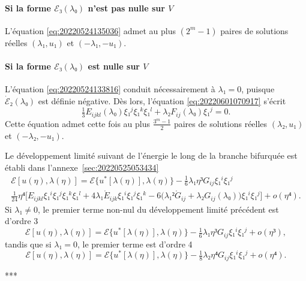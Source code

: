 \documentclass[12pt, final]{scrartcl}
\theoremstyle{definition}
\begin{document}
\paragraph{Si la forme \(ℰ₃(λ₀)\) n'est pas nulle sur \(V\)} L'équation
\eqref{eq:20220524135036} admet au plus \((2^m - 1)\) paires de solutions
réelles \((λ₁, u₁)\) et \((- λ₁, - u₁)\). 

\paragraph{Si la forme \(ℰ₃(λ₀)\) est nulle sur \(V\)} L'équation
\eqref{eq:20220524133816} conduit nécessairement à \(λ₁ = 0\), puisque
\(\dot{ℰ}₂(λ₀)\) est définie négative. Dès lors, l'équation
\eqref{eq:20220601070917} s'écrit 
\begin{equation}
 \tfrac{1}{3} E_{ijkl}(λ₀) ξ₁^j ξ₁^k ξ₁^l + λ₂ F_{ij}(λ₀) ξ₁^j = 0.
\end{equation}
Cette équation admet cette fois au plus \(\frac{3^m - 1}{2}\) paires de
solutions réelles \((λ₂, u₁)\) et \((- λ₂, - u₁)\). 

Le développement limité suivant de l'énergie le long de la branche bifurquée est
établi dans l'annexe~\ref{sec:20220525053434}
\begin{multline}
  \label{eq:20220525053600}
    ℰ[u(η), λ(η)] = ℰ\{u^{\ast}[λ(η)], λ(η)\} - \tfrac{1}{6} λ₁ η³ G_{i j} ξ₁^i ξ₁^j\\
    \tfrac{1}{24} η⁴ \bigl[E_{ijkl} ξ₁^i ξ₁^j ξ₁^k ξ₁^l + 4λ₁ \mathring{E}_{ijk} ξ₁^i ξ₁^j ξ₁^k - 6 \bigl(λ₁² \mathring{G}_{ij} + λ₂ G_{ij}(λ₀)\bigr) ξ₁^i ξ₁^j\bigr] + o(η⁴).
\end{multline}
Si \(λ₁ ≠ 0\), le premier terme non-nul du développement limité précédent est
d'ordre 3
\begin{equation}
 ℰ [u(η), λ(η)] = ℰ\{u^{\ast}[λ(η)], λ(η)\} - \tfrac{1}{6} λ₁ η³ G_{ij} ξ₁^i ξ₁^j + o(η³),
\end{equation}
tandis que si \(λ₁ = 0\), le premier terme est d'ordre 4 
\begin{equation}
 ℰ[u(η), λ(η)] = ℰ\{u^{\ast} [λ(η)], λ(η)\} - \tfrac{1}{8} λ₂ η⁴ G_{ij} ξ₁^i ξ₁^j + o(η⁴).
\end{equation}
\begin{center}
 ***
\end{center}
\end{document}
